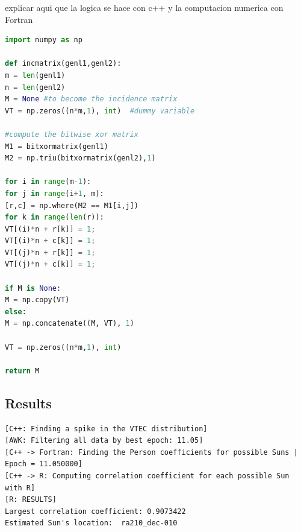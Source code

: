explicar aqui que la logica se hace con c++ y la computacion numerica con Fortran

\begin{lstlisting}[language=Python, caption=Python example]
import numpy as np

def incmatrix(genl1,genl2):
m = len(genl1)
n = len(genl2)
M = None #to become the incidence matrix
VT = np.zeros((n*m,1), int)  #dummy variable

#compute the bitwise xor matrix
M1 = bitxormatrix(genl1)
M2 = np.triu(bitxormatrix(genl2),1) 

for i in range(m-1):
for j in range(i+1, m):
[r,c] = np.where(M2 == M1[i,j])
for k in range(len(r)):
VT[(i)*n + r[k]] = 1;
VT[(i)*n + c[k]] = 1;
VT[(j)*n + r[k]] = 1;
VT[(j)*n + c[k]] = 1;

if M is None:
M = np.copy(VT)
else:
M = np.concatenate((M, VT), 1)

VT = np.zeros((n*m,1), int)

return M
\end{lstlisting}


\subsection{Results}
\begin{lstlisting}[caption=Brute force approach algorithm output]
[C++: Finding a spike in the VTEC distribution]
[AWK: Filtering all data by best epoch: 11.05]
[C++ -> Fortran: Finding the Person coefficients for possible Suns | Epoch = 11.050000]
[C++ -> R: Computing correlation coefficient for each possible Sun with R]
[R: RESULTS] 
Largest correlation coefficient: 0.9073422 
Estimated Sun's location:  ra210_dec-010
\end{lstlisting}